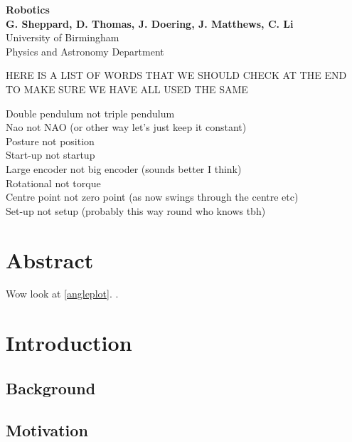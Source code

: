 \documentclass[11pt]{article}
\begin{document}
\begin{titlepage}

    \begin{center}
        \vspace*{1cm}
        \Huge
        \textbf{Robotics} \\
        \vspace{0.5cm}
        \LARGE
        \vspace{1.5cm}
        \textbf{G. Sheppard, D. Thomas, J. Doering, J. Matthews, C. Li} \\
        \vfill
        \vspace{0.8cm}
        \Large
        University of Birmingham\\
        Physics and Astronomy Department\\
    \end{center}
\end{titlepage}

\tableofcontents

HERE IS A LIST OF WORDS THAT WE SHOULD CHECK AT THE END TO MAKE SURE WE HAVE ALL USED THE SAME

Double pendulum not triple pendulum \\
Nao not NAO (or other way let's just keep it constant)\\
Posture not position\\
Start-up not startup\\
Large encoder not big encoder (sounds better I think)\\
Rotational not torque\\
Centre point not zero point (as now swings through the centre etc)\\
Set-up not setup (probably this way round who knows tbh)


\section{Abstract}
Wow look at \ref{angleplot}. \cite{Bae2006}.

\section{Introduction}
\subsection{Background}
\subsection{Motivation}
\end{document}
